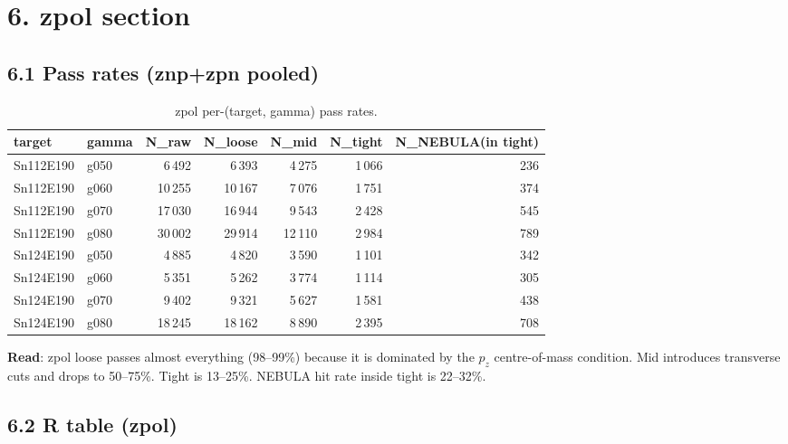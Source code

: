 \documentclass[a4paper,11pt]{article}
\begin{document}
\section{6. zpol section}

\subsection{6.1 Pass rates (znp+zpn pooled)}

\begin{table}[H]
\centering\footnotesize
\caption{zpol per-(target, gamma) pass rates.}
\begin{tabular}{llrrrrr}
\toprule
target & gamma & N\_raw & N\_loose & N\_mid & N\_tight & N\_NEBULA(in tight) \\
\midrule
Sn112E190 & g050 &  6\,492 &  6\,393 &  4\,275 & 1\,066 & 236 \\
Sn112E190 & g060 & 10\,255 & 10\,167 &  7\,076 & 1\,751 & 374 \\
Sn112E190 & g070 & 17\,030 & 16\,944 &  9\,543 & 2\,428 & 545 \\
Sn112E190 & g080 & 30\,002 & 29\,914 & 12\,110 & 2\,984 & 789 \\
Sn124E190 & g050 &  4\,885 &  4\,820 &  3\,590 & 1\,101 & 342 \\
Sn124E190 & g060 &  5\,351 &  5\,262 &  3\,774 & 1\,114 & 305 \\
Sn124E190 & g070 &  9\,402 &  9\,321 &  5\,627 & 1\,581 & 438 \\
Sn124E190 & g080 & 18\,245 & 18\,162 &  8\,890 & 2\,395 & 708 \\
\bottomrule
\end{tabular}
\end{table}

\textbf{Read}: zpol loose passes almost everything (98--99\%) because it is dominated by the $p_z$ centre-of-mass condition. Mid introduces transverse cuts and drops to 50--75\%. Tight is 13--25\%. NEBULA hit rate inside tight is 22--32\%.

\subsection{6.2 R table (zpol)}
\end{document}
